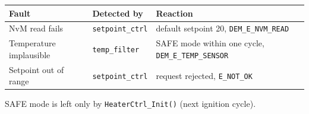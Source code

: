 \begin{ErrorHandling}
\begin{center}
\begin{tabular}{lll}
  \toprule
  \textbf{Fault} & \textbf{Detected by} & \textbf{Reaction} \\ \midrule
  NvM read fails         & \texttt{setpoint\_ctrl} & default setpoint 20, \texttt{DEM\_E\_NVM\_READ} \\
  Temperature implausible & \texttt{temp\_filter}  & SAFE mode within one cycle, \texttt{DEM\_E\_TEMP\_SENSOR} \\
  Setpoint out of range  & \texttt{setpoint\_ctrl} & request rejected, \texttt{E\_NOT\_OK} \\
  \bottomrule
\end{tabular}
\end{center}
SAFE mode is left only by \texttt{HeaterCtrl\_Init()} (next ignition cycle).
\end{ErrorHandling}
